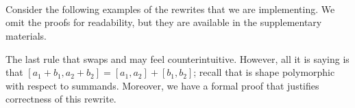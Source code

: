 \begin{code}[hide]%
%
\>[2]\AgdaSpace{}%
\AgdaSymbol{:}\AgdaSpace{}%
\AgdaSpace{}%
\AgdaSymbol{(}\AgdaSpace{}%
\AgdaSymbol{:}\AgdaSpace{}%
\AgdaSpace{}%
\AgdaSpace{}%
\AgdaSymbol{)}\AgdaSpace{}%
\AgdaSpace{}%
\AgdaSpace{}%
\AgdaSpace{}%
\<%
\\
%
\>[2]\AgdaSpace{}%
\AgdaSymbol{\{}\AgdaSymbol{\}}\AgdaSpace{}%
\AgdaSymbol{\{}\AgdaSpace{}%
\AgdaSymbol{\}}\AgdaSpace{}%
\AgdaSymbol{=}\AgdaSpace{}%
\AgdaSpace{}%
\AgdaSpace{}%
\AgdaSpace{}%
\<%
\\
%
\>[2]\AgdaSpace{}%
\AgdaSymbol{\{}\AgdaSymbol{\}}\AgdaSpace{}%
\AgdaSymbol{\{}\AgdaSpace{}%
\AgdaSymbol{\}}\AgdaSpace{}%
\AgdaSymbol{=}\AgdaSpace{}%
\AgdaSpace{}%
\AgdaSpace{}%
\AgdaSpace{}%
\AgdaSpace{}%
\<%
\\
%
\>[2]\AgdaSpace{}%
\AgdaSpace{}%
\AgdaSymbol{=}\AgdaSpace{}%
\AgdaSpace{}%
\AgdaOperator{\AgdaInductiveConstructor{,}}\AgdaSpace{}%
\AgdaSpace{}%
\<%
\end{code}

Consider the following examples of the rewrites that we are implementing.
We omit the proofs for readability, but they are available in the
supplementary materials.
The last rule that swaps  and  may feel counterintuitive.
However, all it is saying is that $[a_1 + b_1, a_2 + b_2] = [a_1, a_2] + [b_1, b_2]$;
recall that  is shape polymorphic with respect to summands.
Moreover, we have a formal proof that justifies correctness of this rewrite.

